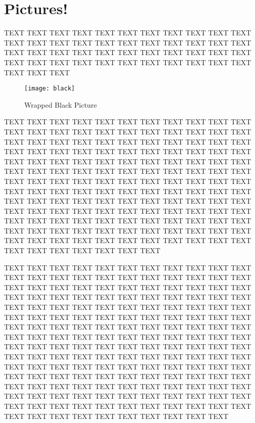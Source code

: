 \documentclass{article}
\begin{document}
\section{Pictures!}

TEXT TEXT TEXT TEXT TEXT TEXT TEXT TEXT TEXT TEXT TEXT TEXT TEXT TEXT TEXT TEXT TEXT TEXT TEXT TEXT TEXT TEXT TEXT TEXT TEXT TEXT TEXT TEXT TEXT TEXT TEXT TEXT TEXT TEXT TEXT TEXT TEXT TEXT TEXT TEXT TEXT TEXT TEXT TEXT TEXT TEXT TEXT 


\begin{wrapfigure}{r}{0.5\textwidth}
\begin{center}
\texttt{[image: black]}
\end{center}
\caption{Wrapped Black Picture}
\end{wrapfigure}

\noindent TEXT TEXT TEXT TEXT TEXT TEXT TEXT TEXT TEXT TEXT TEXT TEXT TEXT TEXT TEXT TEXT TEXT TEXT TEXT TEXT TEXT TEXT TEXT TEXT TEXT TEXT TEXT TEXT TEXT TEXT TEXT TEXT TEXT TEXT TEXT TEXT TEXT TEXT TEXT TEXT TEXT TEXT TEXT TEXT TEXT TEXT TEXT TEXT TEXT TEXT TEXT TEXT TEXT TEXT TEXT TEXT TEXT TEXT TEXT TEXT TEXT TEXT TEXT TEXT TEXT TEXT TEXT TEXT TEXT TEXT TEXT TEXT TEXT TEXT TEXT TEXT TEXT TEXT TEXT TEXT TEXT TEXT TEXT TEXT TEXT TEXT TEXT TEXT TEXT TEXT TEXT TEXT TEXT TEXT TEXT TEXT TEXT TEXT TEXT TEXT TEXT TEXT TEXT TEXT TEXT TEXT TEXT TEXT TEXT TEXT TEXT TEXT TEXT TEXT TEXT TEXT TEXT TEXT TEXT TEXT TEXT TEXT TEXT TEXT TEXT TEXT TEXT TEXT TEXT TEXT TEXT TEXT TEXT TEXT TEXT TEXT TEXT TEXT TEXT TEXT TEXT TEXT TEXT TEXT TEXT TEXT TEXT TEXT TEXT TEXT 


\noindent TEXT TEXT TEXT TEXT TEXT TEXT TEXT TEXT TEXT TEXT TEXT TEXT TEXT TEXT TEXT TEXT TEXT TEXT TEXT TEXT TEXT TEXT TEXT TEXT TEXT TEXT TEXT TEXT TEXT TEXT TEXT TEXT TEXT TEXT TEXT TEXT TEXT TEXT TEXT TEXT TEXT TEXT TEXT TEXT TEXT TEXT TEXT TEXT TEXT TEXT TEXT TEXT TEXT TEXT TEXT TEXT TEXT TEXT TEXT TEXT TEXT TEXT TEXT TEXT TEXT TEXT TEXT TEXT TEXT TEXT TEXT TEXT TEXT TEXT TEXT TEXT TEXT TEXT TEXT TEXT TEXT TEXT TEXT TEXT TEXT TEXT TEXT TEXT TEXT TEXT TEXT TEXT TEXT TEXT TEXT TEXT TEXT TEXT TEXT TEXT TEXT TEXT TEXT TEXT TEXT TEXT TEXT TEXT TEXT TEXT TEXT TEXT TEXT TEXT TEXT TEXT TEXT TEXT TEXT TEXT TEXT TEXT TEXT TEXT TEXT TEXT TEXT TEXT TEXT TEXT TEXT TEXT TEXT TEXT TEXT TEXT TEXT TEXT TEXT TEXT TEXT TEXT TEXT TEXT TEXT TEXT TEXT TEXT TEXT TEXT TEXT TEXT TEXT TEXT TEXT TEXT TEXT TEXT TEXT TEXT TEXT TEXT TEXT TEXT TEXT TEXT TEXT TEXT TEXT TEXT TEXT TEXT TEXT TEXT TEXT 
 
\end{document}
